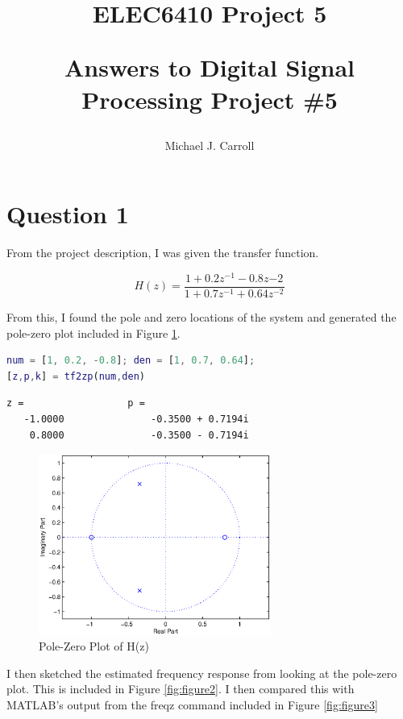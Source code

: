 \documentclass{article}
\title{ELEC6410 Project 5\\
 {\large \begin{par}
Answers to Digital Signal Processing Project \#5
\end{par}
}}
\author{Michael J. Carroll}
\begin{document}
\maketitle
           
\section*{Question 1}
\begin{par}
From the project description, I was given the transfer function.

$$ H(z) = \frac{1 + 0.2z^{-1} - 0.8z{-2}}{1 + 0.7z^{-1} + 0.64z^{-2}} $$

From this, I found the pole and zero locations of the system and generated the pole-zero plot included in Figure \ref{fig:figure1}.
\end{par}
\begin{lstlisting}[language=matlab]
num = [1, 0.2, -0.8]; den = [1, 0.7, 0.64];
[z,p,k] = tf2zp(num,den)
\end{lstlisting}

\begin{verbatim}
z =                  p =
   -1.0000               -0.3500 + 0.7194i
    0.8000               -0.3500 - 0.7194i
\end{verbatim}

\begin{figure}[htp]
	\begin{center}
		\includegraphics [width=3.0in]{polezero.eps}
		\caption{Pole-Zero Plot of H(z)}
		\label{fig:figure1}
	\end{center}
\end{figure}

\begin{par}
I then sketched the estimated frequency response from looking at the pole-zero plot.  This is included in Figure \ref{fig:figure2}.  I then compared this with MATLAB's output from the freqz command included in Figure \ref{fig:figure3}
\end{par}
\end{document}
